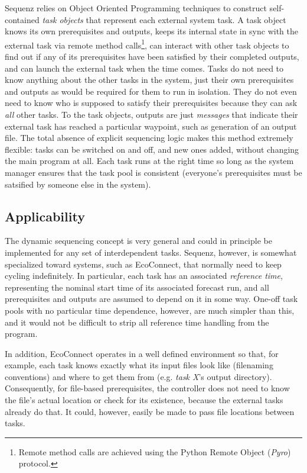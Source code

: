 \documentclass[11pt,a4paper]{article}
\begin{document}
Sequenz relies on Object Oriented Programming techniques to construct
self-contained {\em task objects} that represent each external system
task.  A task object knows its own prerequisites and outputs, keeps its
internal state in sync with the external task via remote method
calls\footnote{Remote method calls are achieved using the Python Remote
Object ({\em Pyro}) protocol.}, can interact with other task objects to
find out if any of its prerequisites have been satisfied by their
completed outputs, and can launch the external task when the time comes.
Tasks do not need to know anything about the other tasks in the system,
just their own prerequisites and outputs as would be required for them
to run in isolation. They do not even need to know who is supposed to
satisfy their prerequisites because they can ask {\em all} other tasks.
To the task objects, outputs are just {\em messages} that indicate their
external task has reached a particular waypoint, such as generation of
an output file. The total absence of explicit sequencing logic makes
this method extremely flexible: tasks can be switched on and off, and
new ones added, without changing the main program at all. Each task runs
at the right time so long as the system manager ensures that the task
pool is consistent (everyone's prerequisites must be satsified by
someone else in the system).


\subsection{Applicability}

The dynamic sequencing concept is very general and could in principle be
implemented for any set of interdependent tasks. Sequenz, however, is
somewhat specialized toward systems, such as EcoConnect, that normally
need to keep cycling indefinitely. In particular, each task has an
associated {\em reference time}, representing the nominal start time of
its associated forecast run, and all prerequisites and outputs are
assumed to depend on it in some way.  One-off task pools with no
particular time dependence, however, are much simpler than this, and it
would not be difficult to strip all reference time handling from the
program.

In addition, EcoConnect operates in a well defined environment so that,
for example, each task knows exactly what its input files look like
(filenaming conventions) and where to get them from (e.g. {\em task X}'s
output directory). Consequently, for file-based prerequisites, the
controller does not need to know the file's actual location or check for
its existence, because the external tasks already do that. It could,
however, easily be made to pass file locations between tasks.  
\end{document}
